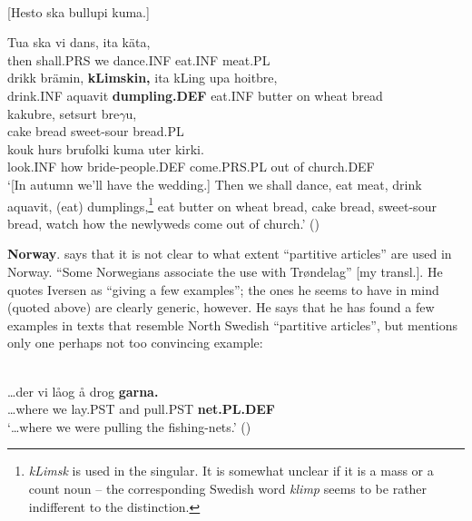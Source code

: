 

\ea\label{}
\\
{}[Hesto ska bullupi kuma.] 

\gll 	Tua  ska  vi  dans,  ita  käta,\\
		then   shall.PRS  we  dance.INF  eat.INF  meat.PL\\
\gll 	drikk  brämin,  \textbf{kLimskin,} ita  kLing  upa  hoitbre,\\
		drink.INF  aquavit  \textbf{dumpling.DEF  } eat.INF  butter  on  wheat bread\\
\gll 	kakubre,  setsurt  bre$\gamma $u,\\
		cake bread  sweet-sour  bread.PL\\
\gll 	kouk  hurs  brufolki  kuma  uter  kirki.\\
		look.INF  how  bride-people.DEF  come.PRS.PL  out of   church.DEF\\
\glt 	‘[In autumn we’ll have the wedding.] Then we shall dance, eat meat, drink aquavit, (eat) dumplings,\footnote{ \textit{k}\textit{L}\textit{imsk} is used in the singular. It is somewhat unclear if it is a mass or a count noun – the corresponding Swedish word \textit{klimp} seems to be rather indifferent to the distinction.  } eat butter on wheat bread, cake bread, sweet-sour bread, watch how the newlyweds come out of church.’ (\citet[76]{Vendell1882})

\z

\textbf{Norway}. \citet[16]{Delsing2003a} says that it is not clear to what extent “partitive articles” are used in Norway. “Some Norwegians associate the use with Trøndelag” [my transl.]. He quotes Iversen as “giving a few examples”; the ones he seems to have in mind (quoted above) are clearly generic, however. He says that he has found a few examples in texts that resemble North Swedish “partitive articles”, but mentions only one perhaps not too convincing example: 


\ea \label{} 
\\
\gll …der  vi  låog  å  drog  \textbf{garna.}\textit{  }\\
…where  we  lay.PST   and  pull.PST  \textbf{net.PL.DEF} \\
\glt ‘…where we were pulling the fishing-nets.’ (\citet[16]{Delsing2003a})

